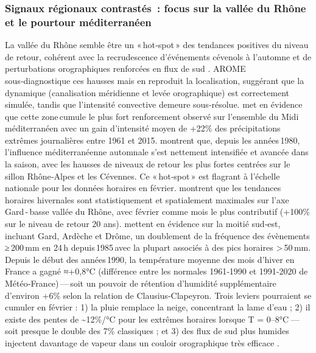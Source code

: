 \documentclass[
  article,
  nofooter,
  noheadings]{jss}
\begin{document}
\subsubsection{Signaux régionaux contrastés~: focus sur la vallée du
Rhône et le pourtour
méditerranéen}\label{signaux-ruxe9gionaux-contrastuxe9s-focus-sur-la-valluxe9e-du-rhuxf4ne-et-le-pourtour-muxe9diterranuxe9en}

La vallée du Rhône semble être un «\,hot‑spot\,» des tendances positives
du niveau de retour, cohérent avec la recrudescence d'événements
cévenols à l'automne et de perturbations orographiques renforcées en
flux de sud \citep{Fresnay2012}. AROME sous‑diagnostique ces hausses
mais en reproduit la localisation, suggérant que la dynamique
(canalisation méridienne et levée orographique) est correctement
simulée, tandis que l'intensité convective demeure sous‑résolue.
\citet{Ribes2018} met en évidence que cette zone\,cumule le plus fort
renforcement observé sur l'ensemble du Midi méditerranéen avec un gain
d'intensité moyen de +22\% des précipitations extrêmes journalières
entre 1961 et 2015. \citet{blanchet2021explaining} montrent que, depuis
les années\,1980, l'influence méditerranéenne automnale s'est nettement
intensifiée et avancée dans la saison, avec les hausses de niveaux de
retour les plus fortes centrées sur le sillon Rhône‑Alpes et les
Cévennes. Ce «\,hot‑spot\,» est flagrant à l'échelle nationale pour les
données horaires en février. \citet{Berghald2025} montrent que les
tendances horaires hivernales sont statistiquement et spatialement
maximales sur l'axe Gard\,-\,basse vallée du Rhône, avec février comme
mois le plus contributif (+100\% sur le niveau de retour 20 ans).
\citet{Ribes2018} mettent en évidence sur la moitié sud‑est, incluant
Gard, Ardèche et Drôme, un doublement de la fréquence des
évènements\,≥\,200\,mm en 24\,h depuis\,1985\,avec la plupart associés à
des pics horaires \textgreater\,50\,mm. Depuis le début des
années\,1990, la température moyenne des mois d'hiver en France a gagné
≈+0,8°C (différence entre les normales 1961‑1990 et 1991‑2020 de
Météo‑France)\,---\,soit un pouvoir de rétention d'humidité
supplémentaire d'environ +6\% selon la relation de Clausius‑Clapeyron.
Trois leviers pourraient se cumuler en février : 1) la pluie remplace la
neige, concentrant la lame d'eau \citep{ZAQOUT2024131439} ; 2) il existe
des pentes de \textasciitilde12\%/°C pour les extrêmes horaires lorsque
T = 0--8°C --- soit presque le double des 7\% classiques
\citep{Drobinski2016} ; et 3) des flux de sud plus humides injectent
davantage de vapeur dans un couloir orographique très efficace
\citep{LorentePlazas2020}.
\end{document}
